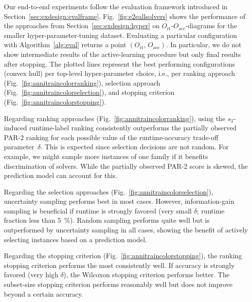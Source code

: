 \documentclass[runningheads]{llncs}
\begin{document}
Our end-to-end experiments follow the evaluation framework introduced in Section~\ref{sec:exdesign:evalframe}.
Fig.~\ref{fig:e2eallsolvers} shows the performance of the approaches from Section~\ref{sec:exdesign:hyper} on $O_{\operatorname{rt}}$-$O_{\operatorname{acc}}$-diagrams for the smaller hyper-parameter-tuning dataset.
Evaluating a particular configuration with Algorithm~\ref{alg:eval} returns a point $\left(O_{\operatorname{rt}},\, O_{\operatorname{acc}}\right)$.
In particular, we do not show intermediate results of the active-learning procedure but only final results after stopping.
The plotted lines represent the best performing configurations (convex hull) per top-level hyper-parameter choice, i.e., per ranking approach (Fig.~\ref{fig:annitraincolorranking}), selection approach (Fig.~\ref{fig:annitraincolorselection}), and stopping criterion (Fig.~\ref{fig:annitraincolorstopping}).

Regarding ranking approaches (Fig.~\ref{fig:annitraincolorranking}), using the $s_3$-induced runtime-label ranking consistently outperforms the partially observed PAR-2 ranking for each possible value of the runtime-accuracy trade-off parameter~$\delta$.
This is expected since selection decisions are not random.
For example, we might sample more instances of one family if it benefits discrimination of solvers.
While the partially observed PAR-2 score is skewed, the prediction model can account for this.

Regarding the selection approaches (Fig.~\ref{fig:annitraincolorselection}), uncertainty sampling performs best in most cases.
However, information-gain sampling is beneficial if runtime is strongly favored (very small $\delta$; runtime fraction less than \SI{5}{\%}).
Random sampling performs quite well but is outperformed by uncertainty sampling in all cases, showing the benefit of actively selecting instances based on a prediction model.

Regarding the stopping criterion (Fig.~\ref{fig:annitraincolorstopping}), the ranking stopping criterion performs the most consistently well.
If accuracy is strongly favored (very high $\delta$), the Wilcoxon stopping criterion performs better.
The subset-size stopping criterion performs reasonably well but does not improve beyond a certain accuracy.

\end{document}
